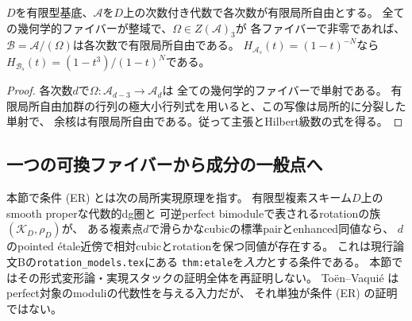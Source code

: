\begin{lemma}[正則中心商の次数別flatness]
\label{cw:lem:flat-quotient}
$D$を有限型基底、$\mathcal A$を$D$上の次数付き代数で各次数が有限局所自由とする。
全ての幾何学的ファイバーが整域で、$\Omega\in Z(\mathcal A)_3$が
各ファイバーで非零であれば、$\mathcal B=\mathcal A/(\Omega)$は各次数で有限局所自由である。
$H_{\mathcal A_s}(t)=(1-t)^{-N}$なら
$H_{\mathcal B_s}(t)=(1-t^3)/(1-t)^N$である。
\end{lemma}
\begin{proof}
各次数$d$で$\Omega:\mathcal A_{d-3}\to\mathcal A_d$は
全ての幾何学的ファイバーで単射である。
有限局所自由加群の行列の極大小行列式を用いると、この写像は局所的に分裂した単射で、
余核は有限局所自由である。従って主張とHilbert級数の式を得る。
\end{proof}

\subsection{一つの可換ファイバーから成分の一般点へ}

\begin{definition}[条件 (ER)]
\label{cw:def:ER}
本節で条件 (ER) とは次の局所実現原理を指す。
有限型複素スキーム$D$上のsmooth properな代数的dg圏と
可逆perfect bimoduleで表されるrotationの族$(\mathcal K_D,\rho_D)$が、
ある複素点$d$で滑らかなcubicの標準pairとenhanced同値なら、
$d$のpointed étale近傍で相対cubicとrotationを保つ同値が存在する。
これは現行論文Bの\texttt{rotation\_models.tex}にある
\texttt{thm:etale}を\emph{入力}とする条件である。
本節ではその形式変形論・実現スタックの証明全体を再証明しない。
Toën--Vaquié \cite[Theorem 3.6]{TV} はperfect対象のmoduliの代数性を与える入力だが、
それ単独が条件 (ER) の証明ではない。
\end{definition}

